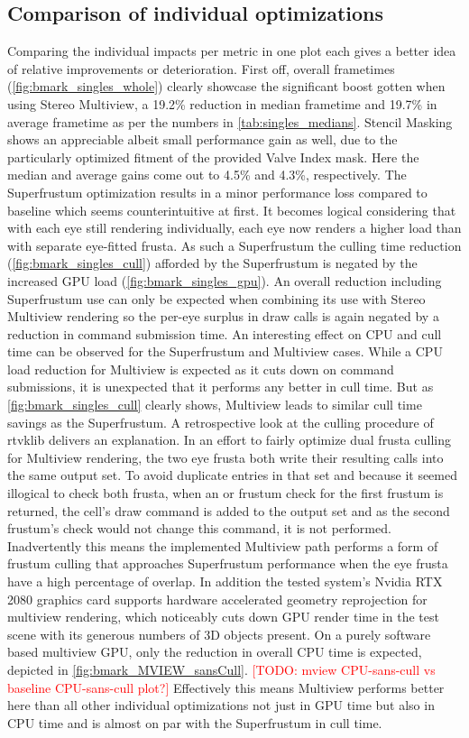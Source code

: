 \subsection{Comparison of individual optimizations} \label{singles_comp}
Comparing the individual impacts per metric in one plot each gives a better idea of relative improvements or deterioration. 
First off, overall frametimes (\autoref{fig:bmark_singles_whole}) clearly showcase the significant boost gotten when using Stereo Multiview, a 19.2\% reduction in median frametime and 19.7\% in average frametime as per the numbers in \autoref{tab:singles_medians}. Stencil Masking shows an appreciable albeit small performance gain as well, due to the particularly optimized fitment of the provided Valve Index mask. Here the median and average gains come out to 4.5\% and 4.3\%, respectively. The Superfrustum optimization results in a minor performance loss compared to baseline which seems counterintuitive at first. It becomes logical considering that with each eye still rendering individually, each eye now renders a higher load than with separate eye-fitted frusta. As such a Superfrustum the culling time reduction (\autoref{fig:bmark_singles_cull}) afforded by the Superfrustum is negated by the increased GPU load (\autoref{fig:bmark_singles_gpu}). An overall reduction including Superfrustum use can only be expected when combining its use with Stereo Multiview rendering so the per-eye surplus in draw calls is again negated by a reduction in command submission time. 
An interesting effect on CPU and cull time can be observed for the Superfrustum and Multiview cases. While a CPU load reduction for Multiview is expected as it cuts down on command submissions, it is unexpected that it performs any better in cull time. But as \autoref{fig:bmark_singles_cull} clearly shows, Multiview leads to similar cull time savings as the Superfrustum. A retrospective look at the culling procedure of \gls{rtvklib} delivers an explanation. In an effort to fairly optimize dual frusta culling for Multiview rendering, the two eye frusta both write their resulting calls into the same output set. To avoid duplicate entries in that set and because it seemed illogical to check both frusta, when an  or  frustum check for the first frustum is returned, the cell's draw command is added to the output set and as the second frustum's check would not change this command, it is not performed. Inadvertently this means the implemented Multiview path performs a form of frustum culling that approaches Superfrustum performance when the eye frusta have a high percentage of overlap. In addition the tested system's Nvidia RTX 2080 graphics card supports hardware accelerated geometry reprojection for multiview rendering, which noticeably cuts down GPU render time in the test scene with its generous numbers of 3D objects present. On a purely software based multiview GPU, only the reduction in overall CPU time is expected, depicted in \autoref{fig:bmark_MVIEW_sansCull}. \textcolor{red}{[TODO: mview CPU-sans-cull vs baseline CPU-sans-cull plot?]} Effectively this means Multiview performs better here than all other individual optimizations not just in GPU time but also in CPU time and is almost on par with the Superfrustum in cull time. \\
